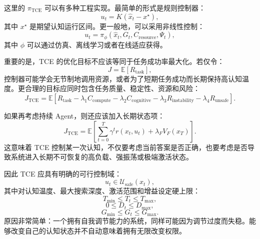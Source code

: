 这里的 $\pi_{\mathrm{TCE}}$ 可以有多种工程实现。最简单的形式是规则控制器：
\begin{equation}
    u_t
    =
    K
    (\hat x_t-x^\star),
\end{equation}
其中 $x^\star$ 是期望认知运行区间。更一般地，可以采用非线性控制：
\begin{equation}
    u_t
    =
    \pi_\phi(
    \hat x_t,
    G_t,
    C_{\mathrm{resource}},
    \Psi_t
    ),
\end{equation}
其中 $\phi$ 可以通过仿真、离线学习或者在线适应获得。

重要的是，TCE 的优化目标不应该等同于任务成功率最大化。若仅令：
\begin{equation}
    J=\mathbb E[R_{\mathrm{task}}],
\end{equation}
控制器可能学会无节制地调用资源，或者为了短期任务成功而长期保持高认知温度。更合理的目标应同时包含任务质量、稳定性、资源和风险：
\begin{equation}
    J_{\mathrm{TCE}}
    =
    \mathbb E
    \left[
    R_{\mathrm{task}}
    -
    \lambda_1C_{\mathrm{compute}}
    -
    \lambda_2C_{\mathrm{cognitive}}
    -
    \lambda_3R_{\mathrm{instability}}
    -
    \lambda_4R_{\mathrm{unsafe}}
    \right].
\end{equation}

如果再考虑持续 Agent，则还应该加入长期状态项：
\begin{equation}
    J_{\mathrm{TCE}}
    =
    \mathbb E
    \left[
    \sum_{t=0}^{T}
    \gamma^t
    r(x_t,u_t)
    +
    \lambda_F V_F(x_T)
    \right].
\end{equation}
这意味着 TCE 控制某一次认知，不仅要考虑当前答案是否正确，也要考虑是否导致系统进入长期不可恢复的高负载、强振荡或极端激活状态。

因此 TCE 应具有明确的可行控制域：
\begin{equation}
    u_t
    \in
    \mathcal U_{\mathrm{safe}}(x_t),
\end{equation}
其中对认知温度、最大搜索深度、激活范围和增益设定硬上限：
\begin{equation}
    T_{\min}
    \le T_t\le T_{\max},
\end{equation}
\begin{equation}
    0\le D_t\le D_{\max},
\end{equation}
\begin{equation}
    G_{\min}
    \le G_t\le G_{\max}.
\end{equation}
原因非常简单：一个拥有自我调节能力的系统，同样可能因为调节过度而失稳。能够改变自己的认知状态并不自动意味着拥有无限改变权限。

